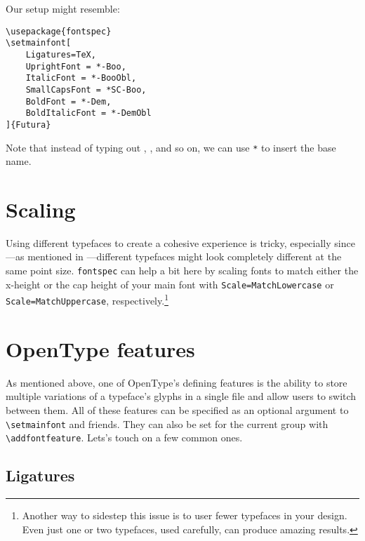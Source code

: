 \newpage
\noindent Our setup might resemble:
\begin{leftfigure}
\begin{lstlisting}
\usepackage{fontspec}
\setmainfont[
    Ligatures=TeX,
    UprightFont = *-Boo,
    ItalicFont = *-BooObl,
    SmallCapsFont = *SC-Boo,
    BoldFont = *-Dem,
    BoldItalicFont = *-DemObl
]{Futura}
\end{lstlisting}
\end{leftfigure}
Note that instead of typing out ,
, and so on, we can use \texttt{*} to insert the base name.

\section{Scaling}

Using different typefaces to create a cohesive experience is tricky,
especially since---as mentioned in ---different typefaces
might look completely different at the same point size.
\texttt{fontspec} can help a bit here by scaling fonts to match either the
x-height or the cap height of your main font with
\verb|Scale=MatchLowercase| or \verb|Scale=MatchUppercase|,
respectively.\footnote{Another way to sidestep this issue is to user fewer
typefaces in your design. Even just one or two typefaces,
used carefully, can produce amazing results.}


\section{OpenType features}

As mentioned above, one of OpenType's defining features is the ability to store
multiple variations of a typeface's glyphs in a single file and allow users
to switch between them.
All of these features can be specified as an optional argument to
\verb|\setmainfont| and friends.
They can also be set for the current group with
\verb|\addfontfeature|.
Lets's touch on a few common ones.

\subsection{Ligatures}


